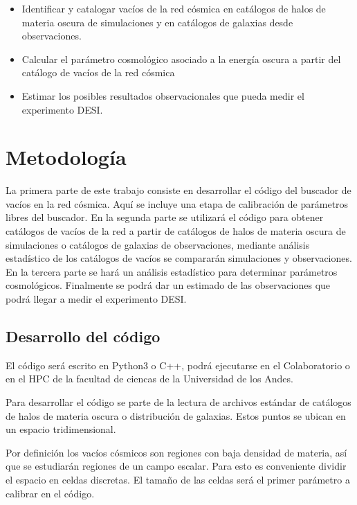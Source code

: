 \documentclass[preprint]{aastex62}
\begin{document}
  \begin{itemize}

      \item Identificar y catalogar vacíos de la red cósmica en catálogos de halos de materia oscura de
  simulaciones y en catálogos de galaxias desde observaciones.

      \item Calcular el parámetro cosmológico asociado a la energía oscura a partir del catálogo de
  vacíos de la red cósmica

    \item  Estimar los posibles resultados observacionales que pueda medir el experimento DESI.
  \end{itemize}
  
  \section{Metodología}

  La primera parte de este trabajo consiste en desarrollar el código del buscador de vacíos
  en la red cósmica. Aquí se incluye una etapa de calibración de parámetros libres del buscador.
  En la segunda parte se utilizará el código para obtener catálogos
  de vacíos de la red a partir de catálogos de halos de materia oscura de simulaciones o
  catálogos de galaxias de observaciones, mediante análisis estadístico de los catálogos de
  vacíos se compararán simulaciones y observaciones.
  En la tercera parte se hará un análisis estadístico para determinar parámetros cosmológicos.
  Finalmente se podrá dar un estimado de las observaciones que podrá llegar a medir el
  experimento DESI.

  \subsection{Desarrollo del código}

  El código será escrito en Python3 o C++, podrá ejecutarse en el Colaboratorio o en el HPC de la
  facultad de ciencas de la Universidad de los Andes.
  
  Para desarrollar el código se parte de la lectura de archivos estándar de catálogos de halos
  de materia oscura o distribución de galaxias. Estos puntos se ubican en un espacio tridimensional.

  Por definición los vacíos cósmicos son regiones con baja densidad de materia, así que se
  estudiarán regiones de un campo escalar. Para esto es conveniente dividir el espacio en
  celdas discretas. El tamaño de las celdas será el primer parámetro a calibrar en el código.
  
\end{document}

